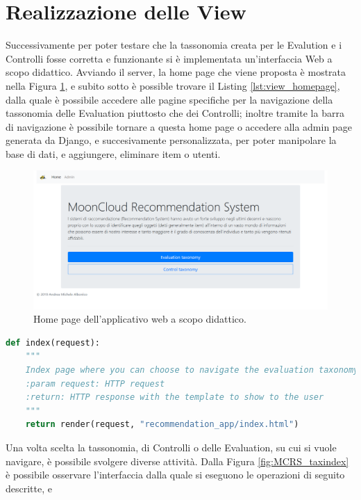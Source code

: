\section*{Realizzazione delle View}
Successivamente per poter testare che la tassonomia creata per le Evalution e i Controlli fosse corretta e funzionante si è 
implementata un'interfaccia Web a scopo didattico.
Avviando il server, la home page che viene proposta è mostrata nella Figura \ref{fig:MCRS_homepage}, e subito 
sotto è possible trovare il Listing \ref{lst:view_homepage}, dalla quale è possibile 
accedere alle pagine specifiche per la navigazione della tassonomia delle Evaluation piuttosto che dei Controlli; inoltre 
tramite la barra di navigazione è possibile tornare a questa home page o accedere alla admin page generata da Django, e 
succesivamente personalizzata, per poter manipolare la base di dati, e aggiungere, eliminare item o utenti.
%
\begin{figure}[ht!]
    \includegraphics[scale=0.3]{images/MCRS_homepage.png}
    \caption{Home page dell'applicativo web a scopo didattico.}
    \label{fig:MCRS_homepage}
\end{figure}
\lstset{style=python_code_style}
\begin{lstlisting}[language=Python, label=lst:view_homepage, caption={Parte principale del codice delle View della soluzione per gestire l'accesso 
    alla home page.}]
def index(request):
    """
    Index page where you can choose to navigate the evaluation taxonomy or the control taxonomy.
    :param request: HTTP request
    :return: HTTP response with the template to show to the user
    """
    return render(request, "recommendation_app/index.html")
\end{lstlisting}
%
Una volta scelta la tassonomia, di Controlli o delle Evaluation, su cui si vuole navigare, è possibile svolgere diverse attività. 
Dalla Figura \ref{fig:MCRS_taxindex} è possibile osservare l'interfaccia dalla quale si eseguono le operazioni di seguito descritte, e
